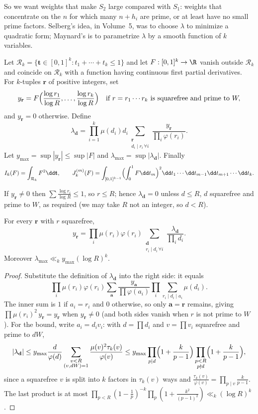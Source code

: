 So we want weights that make $S_2$ large compared with $S_1$: weights that concentrate on the $n$ for which many $n+h_i$ are prime, or at least have no small prime factors. Selberg's idea, in Volume~5, was to choose $\lambda$ to minimize a quadratic form; Maynard's is to parametrize $\lambda$ by a smooth function of $k$ variables.

\begin{definition}\label{def:yweights}
Let $\mathcal R_k=\{\mathbf t\in[0,1]^k:t_1+\cdots+t_k\le1\}$ and let $F:[0,1]^k\to\R$ vanish outside $\mathcal R_k$ and coincide on $\mathcal R_k$ with a function having continuous first partial derivatives. For $k$-tuples $\mathbf r$ of positive integers, set
\[
y_{\mathbf r}=F\Bigl(\frac{\log r_1}{\log R},\dots,\frac{\log r_k}{\log R}\Bigr)\quad\text{if }r=r_1\cdots r_k\text{ is squarefree and prime to }W,
\]
and $y_{\mathbf r}=0$ otherwise. Define
\[
\lambda_{\mathbf d}=\prod_{i=1}^k\mu(d_i)d_i\sum_{\substack{\mathbf r\\d_i\mid r_i\,\forall i}}\frac{y_{\mathbf r}}{\prod_i\varphi(r_i)}.
\]
Let $y_{\max}=\sup|y_{\mathbf r}|\le\sup|F|$ and $\lambda_{\max}=\sup|\lambda_{\mathbf d}|$. Finally
\[
I_k(F)=\int_{\mathcal R_k}F^2\dd\mathbf t,\qquad J_k^{(m)}(F)=\int_{[0,1]^{k-1}}\Bigl(\int_0^1F\dd t_m\Bigr)^2\dd t_1\cdots\dd t_{m-1}\dd t_{m+1}\cdots\dd t_k.
\]
\end{definition}

If $y_{\mathbf r}\ne0$ then $\sum\frac{\log r_i}{\log R}\le1$, so $r\le R$; hence $\lambda_{\mathbf d}=0$ unless $d\le R$, $d$ squarefree and prime to $W$, as required (we may take $R$ not an integer, so $d<R$).

\begin{lemma}\label{lem:inversion}
For every $\mathbf r$ with $r$ squarefree,
\[
y_{\mathbf r}=\prod_i\mu(r_i)\varphi(r_i)\sum_{\substack{\mathbf d\\r_i\mid d_i\,\forall i}}\frac{\lambda_{\mathbf d}}{\prod_id_i}.
\]
Moreover $\lambda_{\max}\ll_ky_{\max}(\log R)^k$.
\end{lemma}
\begin{proof}
Substitute the definition of $\lambda_{\mathbf d}$ into the right side: it equals
\[
\prod_i\mu(r_i)\varphi(r_i)\sum_{\mathbf a}\frac{y_{\mathbf a}}{\prod\varphi(a_i)}\prod_i\sum_{r_i\mid d_i\mid a_i}\mu(d_i).
\]
The inner sum is $1$ if $a_i=r_i$ and $0$ otherwise, so only $\mathbf a=\mathbf r$ remains, giving $\prod\mu(r_i)^2\,y_{\mathbf r}=y_{\mathbf r}$ when $y_{\mathbf r}\ne0$ (and both sides vanish when $r$ is not prime to $W$). For the bound, write $a_i=d_iv_i$: with $d=\prod d_i$ and $v=\prod v_i$ squarefree and prime to $dW$,
\[
|\lambda_{\mathbf d}|\le y_{\max}\frac d{\varphi(d)}\sum_{\substack{v<R\\(v,dW)=1}}\frac{\mu(v)^2\tau_k(v)}{\varphi(v)}\le y_{\max}\prod_{p\mid d}\Bigl(1+\frac k{p-1}\Bigr)\prod_{\substack{p<R\\p\nmid d}}\Bigl(1+\frac k{p-1}\Bigr),
\]
since a squarefree $v$ is split into $k$ factors in $\tau_k(v)$ ways and $\frac{\tau_k(v)}{\varphi(v)}=\prod_{p\mid v}\frac k{p-1}$. The last product is at most $\prod_{p<R}(1-\frac1p)^{-k}\prod_p(1+\frac{k^2}{(p-1)^2})\ll_k(\log R)^k$.
\end{proof}

